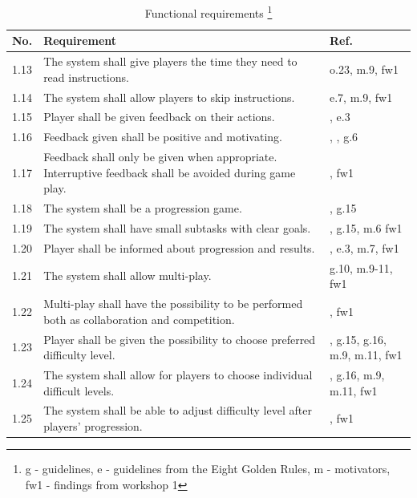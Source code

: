 \begin{minipage}{12 cm}
\begin{table} [H]
\centering
\begin{tabular}{|>{\raggedright}p{}|p{}|p{}|}
\hline
\textbf{No.} & \textbf{Requirement} & \textbf{Ref.} \\ \hline
1.13 & The system shall give players the time they need to read instructions. & o.23, m.9, fw1 \\ \hline 
1.14 & The system shall allow players to skip instructions. & \cite{sweetser} e.7, m.9, fw1 \\ \hline 
1.15 & Player shall be given feedback on their actions. &  \cite{sweetser}, e.3 \\ \hline
1.16 & Feedback given shall be positive and motivating. &  \cite{sweetser}, \cite{project}, g.6 \\ \hline
1.17 & Feedback shall only be given when appropriate. Interruptive feedback shall be avoided during game play. &  \cite{sweetser}, fw1 \\ \hline
1.18 & The system shall be a progression game. & \cite{understandingvg} \cite{sweetser}, g.15 \\ \hline
1.19 & The system shall have small subtasks with clear goals. &  \cite{sweetser} \cite{john2012smartsenior}, g.15, m.6 fw1\\ \hline
1.20 & Player shall be informed about progression and results. & \cite{sweetser} \cite{john2012smartsenior}, e.3, m.7, fw1 \\ \hline
1.21 & The system shall allow multi-play. & g.10, m.9-11, fw1 \\ \hline
1.22 & Multi-play shall have the possibility to be performed both as collaboration and competition. & \cite{sweetser}, fw1\\ \hline
1.23 & Player shall be given the possibility to choose preferred difficulty level. & \cite{sweetser}, g.15, g.16, m.9, m.11, fw1\\ \hline
1.24 & The system shall allow for players to choose individual difficult levels. & \cite{sweetser}, g.16, m.9, m.11, fw1\\ \hline
1.25 & The system shall be able to adjust difficulty level after players' progression. & \cite{sweetser}, fw1 \\ \hline
    \end{tabular}
    \caption[Functional requirements, part 2]{Functional requirements \footnote{g - guidelines, e - guidelines from the Eight Golden Rules, m - motivators, fw1 - findings from workshop 1}}
    \label{tab:func2}
\end{table} 
\end{minipage}


